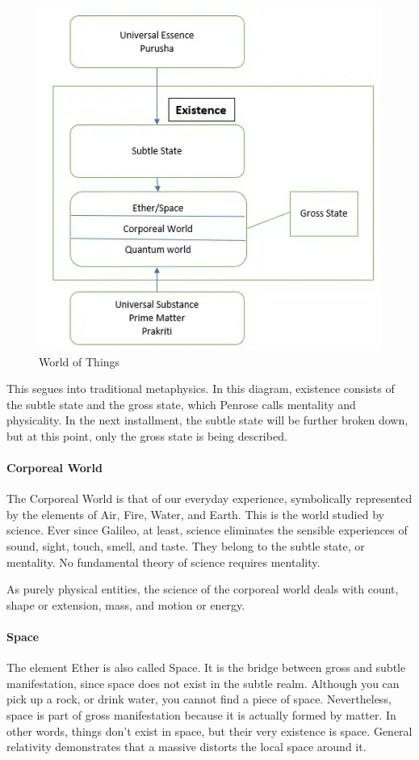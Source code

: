 \begin{figure}[t]
\centering
\includegraphics[scale=.5]{a20221106SacredScience107TheHeartoftheMatter-img002.png} 
\caption{World of Things}
\end{figure}

This segues into traditional metaphysics. In this diagram, existence consists of the subtle state and the gross state, which Penrose calls mentality and physicality. In the next installment, the subtle state will be further broken down, but at this point, only the gross state is being described.

\paragraph{Corporeal World}
The Corporeal World is that of our everyday experience, symbolically represented by the elements of Air, Fire, Water, and Earth. This is the world studied by science. Ever since Galileo, at least, science eliminates the sensible experiences of sound, sight, touch, smell, and taste. They belong to the subtle state, or mentality. No fundamental theory of science requires mentality.

As purely physical entities, the science of the corporeal world deals with count, shape or extension, mass, and motion or energy.

\paragraph{Space}
The element Ether is also called Space. It is the bridge between gross and subtle manifestation, since space does not exist in the subtle realm. Although you can pick up a rock, or drink water, you cannot find a piece of space. Nevertheless, space is part of gross manifestation because it is actually formed by matter. In other words, things don't exist in space, but their very existence is space. General relativity demonstrates that a massive distorts the local space around it.

